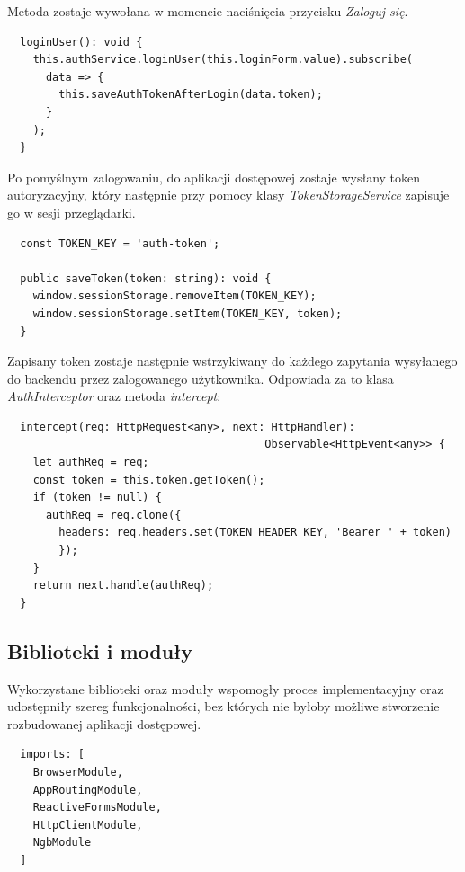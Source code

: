 Metoda zostaje wywołana w momencie naciśnięcia przycisku \textit{Zaloguj się}.
\begin{lstlisting}
  loginUser(): void {
    this.authService.loginUser(this.loginForm.value).subscribe(
      data => {
        this.saveAuthTokenAfterLogin(data.token);
      }
    );
  }
\end{lstlisting}

Po pomyślnym zalogowaniu, do aplikacji dostępowej zostaje wysłany token autoryzacyjny, który następnie przy pomocy klasy \textit{TokenStorageService} zapisuje go w sesji przeglądarki.
\begin{lstlisting}
  const TOKEN_KEY = 'auth-token';

  public saveToken(token: string): void {
    window.sessionStorage.removeItem(TOKEN_KEY);
    window.sessionStorage.setItem(TOKEN_KEY, token);
  }
\end{lstlisting}

Zapisany token zostaje następnie wstrzykiwany do każdego zapytania wysyłanego do backendu przez zalogowanego użytkownika. Odpowiada za to klasa \textit{AuthInterceptor} oraz metoda \textit{intercept}:
\begin{lstlisting}
  intercept(req: HttpRequest<any>, next: HttpHandler): 
                                        Observable<HttpEvent<any>> {
    let authReq = req;
    const token = this.token.getToken();
    if (token != null) {
      authReq = req.clone({ 
        headers: req.headers.set(TOKEN_HEADER_KEY, 'Bearer ' + token) 
        });
    }
    return next.handle(authReq);
  }
\end{lstlisting}

\subsection{Biblioteki i moduły}
Wykorzystane biblioteki oraz moduły wspomogły proces implementacyjny oraz udostępniły szereg funkcjonalności, bez których nie byłoby możliwe stworzenie rozbudowanej aplikacji dostępowej.
\begin{lstlisting}
  imports: [
    BrowserModule,
    AppRoutingModule,
    ReactiveFormsModule,
    HttpClientModule,
    NgbModule
  ]
\end{lstlisting}

